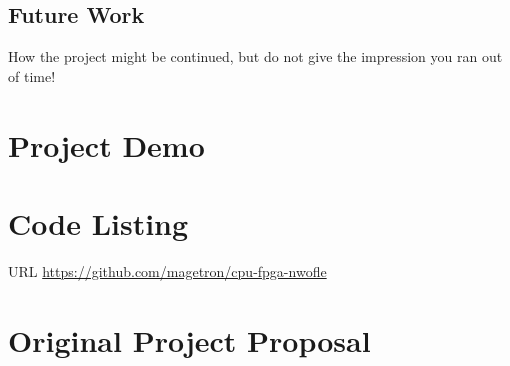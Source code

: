 \documentclass[a4paper]{report}
\begin{document}
\section{Future Work}
How the project might be continued, but do not give the impression you ran out of time!

\printbibliography[title=References]

\appendix

\chapter{Project Demo}

\chapter{Code Listing}

URL \url{https://github.com/magetron/cpu-fpga-nwofle}

\chapter{Original Project Proposal}
\end{document}
